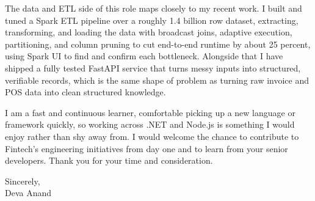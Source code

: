 \documentclass[letterpaper,11pt]{article}
\begin{document}
The data and ETL side of this role maps closely to my recent work. I built and tuned a Spark ETL pipeline over a roughly 1.4 billion row dataset, extracting, transforming, and loading the data with broadcast joins, adaptive execution, partitioning, and column pruning to cut end-to-end runtime by about 25 percent, using Spark UI to find and confirm each bottleneck. Alongside that I have shipped a fully tested FastAPI service that turns messy inputs into structured, verifiable records, which is the same shape of problem as turning raw invoice and POS data into clean structured knowledge.

I am a fast and continuous learner, comfortable picking up a new language or framework quickly, so working across .NET and Node.js is something I would enjoy rather than shy away from. I would welcome the chance to contribute to Fintech's engineering initiatives from day one and to learn from your senior developers. Thank you for your time and consideration.

\vspace{6pt}

\noindent Sincerely,\\
Deva Anand
\end{document}
